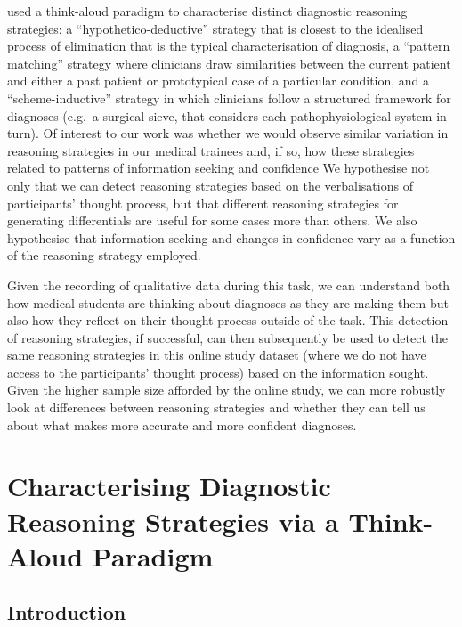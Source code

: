 \documentclass[a4paper, nobind]{templates/ociamthesis}
\begin{document}
\hfill\break
\textcite{coderre_diagnostic_2003} used a think-aloud paradigm to characterise distinct diagnostic reasoning strategies: a ``hypothetico-deductive'' strategy that is closest to the idealised process of elimination that is the typical characterisation of diagnosis, a ``pattern matching'' strategy where clinicians draw similarities between the current patient and either a past patient or prototypical case of a particular condition, and a ``scheme-inductive'' strategy in which clinicians follow a structured framework for diagnoses (e.g.~a surgical sieve, that considers each pathophysiological system in turn). Of interest to our work was whether we would observe similar variation in reasoning strategies in our medical trainees and, if so, how these strategies related to patterns of information seeking and confidence We hypothesise not only that we can detect reasoning strategies based on the verbalisations of participants' thought process, but that different reasoning strategies for generating differentials are useful for some cases more than others. We also hypothesise that information seeking and changes in confidence vary as a function of the reasoning strategy employed.

\hfill\break
Given the recording of qualitative data during this task, we can understand both how medical students are thinking about diagnoses as they are making them but also how they reflect on their thought process outside of the task. This detection of reasoning strategies, if successful, can then subsequently be used to detect the same reasoning strategies in this online study dataset (where we do not have access to the participants' thought process) based on the information sought. Given the higher sample size afforded by the online study, we can more robustly look at differences between reasoning strategies and whether they can tell us about what makes more accurate and more confident diagnoses.

\chapter{Characterising Diagnostic Reasoning Strategies via a Think-Aloud Paradigm}\label{chapter-4}

\adjustmtc
{}

\section{Introduction}\label{introduction-2}
\end{document}
